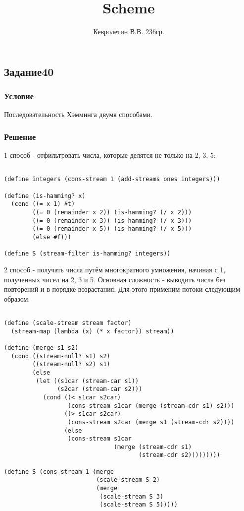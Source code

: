\documentclass[10pt,a4paper]{article}
\author{Кевролетин В.В. 236гр.}
\title{Scheme}
\begin{document}
\maketitle

\subsection*{Задание40}
\subsubsection*{Условие}
Последовательность Хэмминга двумя способами. 
\subsubsection*{Решение}
1 способ - отфильтровать числа, которые делятся не только на 2, 3, 5:
\begin{lstlisting}

(define integers (cons-stream 1 (add-streams ones integers)))

(define (is-hamming? x)
  (cond ((= x 1) #t)
        ((= 0 (remainder x 2)) (is-hamming? (/ x 2)))
        ((= 0 (remainder x 3)) (is-hamming? (/ x 3)))
        ((= 0 (remainder x 5)) (is-hamming? (/ x 5)))
        (else #f)))

(define S (stream-filter is-hamming? integers))

\end{lstlisting}

2 способ - получать числа путём многократного умножения, начиная с 1,
полученных чисел на 2, 3 и 5. Основная сложность - выводить числа без
повторений и в порядке возрастания. Для этого применим потоки
следующим образом:
\begin{lstlisting}

(define (scale-stream stream factor)
  (stream-map (lambda (x) (* x factor)) stream))

(define (merge s1 s2)
  (cond ((stream-null? s1) s2)
        ((stream-null? s2) s1)
        (else
         (let ((s1car (stream-car s1))
               (s2car (stream-car s2)))
           (cond ((< s1car s2car)
                  (cons-stream s1car (merge (stream-cdr s1) s2)))
                 ((> s1car s2car)
                  (cons-stream s2car (merge s1 (stream-cdr s2))))
                 (else
                  (cons-stream s1car
                               (merge (stream-cdr s1)
                                      (stream-cdr s2)))))))))

(define S (cons-stream 1 (merge
                          (scale-stream S 2)
                          (merge 
                           (scale-stream S 3)
                           (scale-stream S 5)))))

\end{lstlisting}


\end{document}
